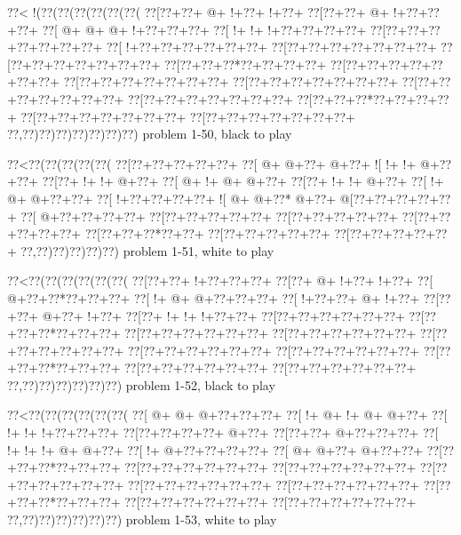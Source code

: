 \vbox{\vbox{\goo
\0??<\- !(\0??(\0??(\0??(\0??(\0??(\0??(
\0??[\0??+\0??+\- @+\- !+\0??+\- !+\0??+
\0??[\0??+\0??+\- @+\- !+\0??+\0??+\0??+
\0??[\- @+\- @+\- @+\- !+\0??+\0??+\0??+
\0??[\- !+\- !+\- !+\0??+\0??+\0??+\0??+
\0??[\0??+\0??+\0??+\0??+\0??+\0??+\0??+
\0??[\- !+\0??+\0??+\0??+\0??+\0??+\0??+
\0??[\0??+\0??+\0??+\0??+\0??+\0??+\0??+
\0??[\0??+\0??+\0??+\0??+\0??+\0??+\0??+
\0??[\0??+\0??+\0??*\0??+\0??+\0??+\0??+
\0??[\0??+\0??+\0??+\0??+\0??+\0??+\0??+
\0??[\0??+\0??+\0??+\0??+\0??+\0??+\0??+
\0??[\0??+\0??+\0??+\0??+\0??+\0??+\0??+
\0??[\0??+\0??+\0??+\0??+\0??+\0??+\0??+
\0??[\0??+\0??+\0??+\0??+\0??+\0??+\0??+
\0??[\0??+\0??+\0??*\0??+\0??+\0??+\0??+
\0??[\0??+\0??+\0??+\0??+\0??+\0??+\0??+
\0??[\0??+\0??+\0??+\0??+\0??+\0??+\0??+
\0??,\0??)\0??)\0??)\0??)\0??)\0??)\0??)
}
\hfil problem 1-50, black to play\hfil\break
}

\vbox{\vbox{\goo
\0??<\0??(\0??(\0??(\0??(\0??(
\0??[\0??+\0??+\0??+\0??+\0??+
\0??[\- @+\- @+\0??+\- @+\0??+
\- ![\- !+\- !+\- @+\0??+\0??+
\0??[\0??+\- !+\- !+\- @+\0??+
\0??[\- @+\- !+\- @+\- @+\0??+
\0??[\0??+\- !+\- !+\- @+\0??+
\0??[\- !+\- @+\- @+\0??+\0??+
\0??[\- !+\0??+\0??+\0??+\0??+
\- ![\- @+\- @+\0??*\- @+\0??+
\- @[\0??+\0??+\0??+\0??+\0??+
\0??[\- @+\0??+\0??+\0??+\0??+
\0??[\0??+\0??+\0??+\0??+\0??+
\0??[\0??+\0??+\0??+\0??+\0??+
\0??[\0??+\0??+\0??+\0??+\0??+
\0??[\0??+\0??+\0??*\0??+\0??+
\0??[\0??+\0??+\0??+\0??+\0??+
\0??[\0??+\0??+\0??+\0??+\0??+
\0??,\0??)\0??)\0??)\0??)\0??)
}
\hfil problem 1-51, white to play\hfil\break
}

\vbox{\vbox{\goo
\0??<\0??(\0??(\0??(\0??(\0??(\0??(
\0??[\0??+\0??+\- !+\0??+\0??+\0??+
\0??[\0??+\- @+\- !+\0??+\- !+\0??+
\0??[\- @+\0??+\0??*\0??+\0??+\0??+
\0??[\- !+\- @+\- @+\0??+\0??+\0??+
\0??[\- !+\0??+\0??+\- @+\- !+\0??+
\0??[\0??+\0??+\- @+\0??+\- !+\0??+
\0??[\0??+\- !+\- !+\- !+\0??+\0??+
\0??[\0??+\0??+\0??+\0??+\0??+\0??+
\0??[\0??+\0??+\0??*\0??+\0??+\0??+
\0??[\0??+\0??+\0??+\0??+\0??+\0??+
\0??[\0??+\0??+\0??+\0??+\0??+\0??+
\0??[\0??+\0??+\0??+\0??+\0??+\0??+
\0??[\0??+\0??+\0??+\0??+\0??+\0??+
\0??[\0??+\0??+\0??+\0??+\0??+\0??+
\0??[\0??+\0??+\0??*\0??+\0??+\0??+
\0??[\0??+\0??+\0??+\0??+\0??+\0??+
\0??[\0??+\0??+\0??+\0??+\0??+\0??+
\0??,\0??)\0??)\0??)\0??)\0??)\0??)
}
\hfil problem 1-52, black to play\hfil\break
}

\vbox{\vbox{\goo
\0??<\0??(\0??(\0??(\0??(\0??(\0??(
\0??[\- @+\- @+\- @+\0??+\0??+\0??+
\0??[\- !+\- @+\- !+\- @+\- @+\0??+
\0??[\- !+\- !+\- !+\0??+\0??+\0??+
\0??[\0??+\0??+\0??+\0??+\- @+\0??+
\0??[\0??+\0??+\- @+\0??+\0??+\0??+
\0??[\- !+\- !+\- !+\- @+\- @+\0??+
\0??[\- !+\- @+\0??+\0??+\0??+\0??+
\0??[\- @+\- @+\0??+\- @+\0??+\0??+
\0??[\0??+\0??+\0??*\0??+\0??+\0??+
\0??[\0??+\0??+\0??+\0??+\0??+\0??+
\0??[\0??+\0??+\0??+\0??+\0??+\0??+
\0??[\0??+\0??+\0??+\0??+\0??+\0??+
\0??[\0??+\0??+\0??+\0??+\0??+\0??+
\0??[\0??+\0??+\0??+\0??+\0??+\0??+
\0??[\0??+\0??+\0??*\0??+\0??+\0??+
\0??[\0??+\0??+\0??+\0??+\0??+\0??+
\0??[\0??+\0??+\0??+\0??+\0??+\0??+
\0??,\0??)\0??)\0??)\0??)\0??)\0??)
}
\hfil problem 1-53, white to play\hfil\break
}

